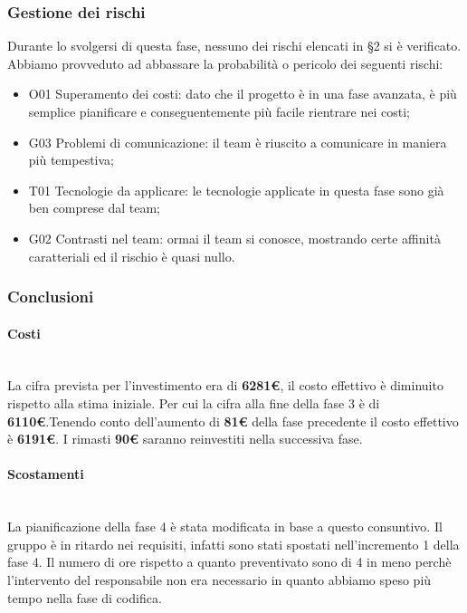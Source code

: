 	\subsubsection{Gestione dei rischi}
	Durante lo svolgersi di questa fase, nessuno dei rischi elencati in \S2 si è verificato. Abbiamo provveduto ad abbassare la probabilità o pericolo dei seguenti rischi: 
	\begin{itemize}
	\item 		O01 Superamento dei costi: dato che il progetto è in una fase avanzata, è più semplice pianificare e conseguentemente più facile rientrare nei costi;
	\item 		G03 Problemi di comunicazione: il team è riuscito a comunicare in maniera più tempestiva;
	\item		T01 Tecnologie da applicare: le tecnologie applicate in questa fase sono già ben comprese dal team;
	\item 		G02 Contrasti nel team: ormai il team si conosce, mostrando certe affinità caratteriali ed il rischio è quasi nullo.
	\end{itemize}

	\subsubsection{Conclusioni}
	\paragraph{Costi\\}\noindent\\
 La cifra prevista per l'investimento era di \textbf{6281€}, il costo effettivo è diminuito rispetto alla stima iniziale. Per cui la cifra alla fine della fase 3 è di \textbf{6110€}.Tenendo conto dell'aumento di \textbf{81€} della fase precedente il costo effettivo è \textbf{6191€}.
I rimasti \textbf{90€} saranno reinvestiti nella successiva fase.

\paragraph{Scostamenti\\}\noindent\\
La pianificazione della fase 4 è stata modificata in base a questo consuntivo.
Il gruppo è in ritardo nei requisiti, infatti sono stati spostati nell'incremento 1 della fase 4. Il numero di ore rispetto a quanto preventivato sono di 4 in meno perchè l'intervento del responsabile non era necessario in quanto abbiamo speso più tempo nella fase di codifica.

